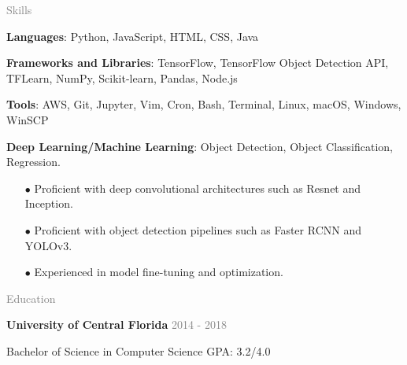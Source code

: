\documentclass[11pt]{article}
\newcommand{\rsection}[1]{\vspace{1.5em}\textcolor{gray}{\Large \robotoslab #1}\vspace{0.5em}}
\newcommand{\bt}[1]{\textbf{#1}} %
\newcommand{\gray}[1]{\textcolor{gray}{#1}}
\begin{document}
\rsection{Skills}

\textbf{Languages}: Python, JavaScript, HTML, CSS, Java

\textbf{Frameworks and Libraries}: TensorFlow, TensorFlow Object Detection API, TFLearn, NumPy, Scikit-learn, Pandas, Node.js

\textbf{Tools}: AWS, Git, Jupyter, Vim, Cron, Bash, Terminal, Linux, macOS, Windows, WinSCP

\textbf{Deep Learning/Machine Learning}: Object Detection, Object Classification, Regression. 
\begin{itemize}
\item[$\bullet$] Proficient with deep convolutional architectures such as Resnet and Inception.
\item[$\bullet$] Proficient with object detection pipelines such as Faster RCNN and YOLOv3.
\item[$\bullet$] Experienced in model fine-tuning and optimization.
\end{itemize}

\rsection{Education}

\bt{University of Central Florida} \hfill \gray{2014 - 2018}

Bachelor of Science in Computer Science \hfill GP\hspace{-0.5px}A: 3.2/4.0
\end{document}
